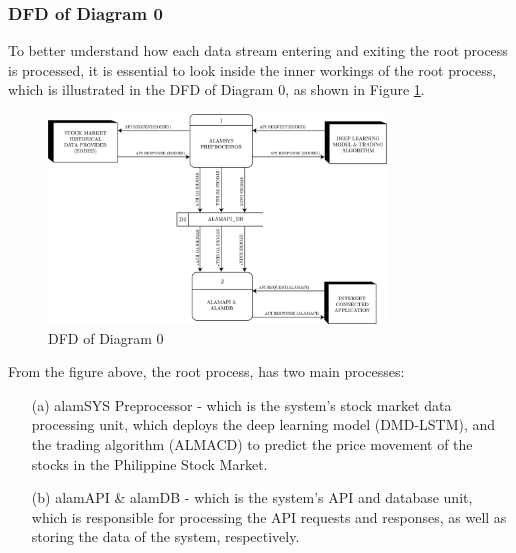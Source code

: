 \subsubsection{DFD of Diagram 0}
\label{subsubsec:dfd0}
To better understand how each data stream entering and exiting the root process is processed, 
it is essential to look inside the inner workings of the root process, which is illustrated in the DFD of Diagram 0, 
as shown in Figure \ref{fig:dfd0}.
\begin{figure}[ht]
    \centering
    \includegraphics[width=0.80\textwidth]{./assets/Chapter_3/DFD/DFD_0.png}
    \caption{DFD of Diagram 0}
    \label{fig:dfd0}
\end{figure}
\FloatBarrier

From the figure above, the root process, has two main processes:
\begin{itemize}
    \item[(a)] alamSYS Preprocessor - which is the system’s stock market data processing unit, which deploys
    the deep learning model (DMD-LSTM), and the trading algorithm (ALMACD) to predict the price movement of the
    stocks in the Philippine Stock Market.
    \item[(b)] alamAPI \& alamDB - which is the system’s API and database unit, which is responsible for
    processing the API requests and responses, as well as storing the data of 
    the system, respectively.
\end{itemize}

